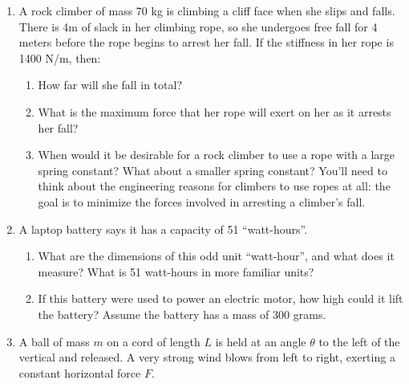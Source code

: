 \documentclass[12pt]{article}
\begin{document}
\Large
\centerline{}
\normalsize
\centerline{}

\begin{enumerate}

\item{A rock climber of mass 70 kg is climbing a cliff face when she slips and falls. There is 4m of slack in her climbing rope, so she undergoes free fall for 4 meters before the rope begins to arrest her fall. If the stiffness in her rope is 1400 N/m, then:}
  \begin{enumerate}
    \item{How far will she fall in total?}
\vspace{2in}

    \item{What is the maximum force that her rope will exert on her as it arrests her fall?}
\vspace{2in}

    \item When would it be desirable for a rock climber to use a rope with a large spring constant? What about a smaller spring constant? You'll need to think about 
          the engineering reasons for climbers to use ropes at all: the goal is to minimize the forces involved in arresting a climber's fall.
   \end{enumerate}

\newpage

 \item{A laptop battery says it has a capacity of 51 ``watt-hours''.}
   \begin{enumerate}
     \item{What are the dimensions of this odd unit ``watt-hour'', and what does it measure? What is 51 watt-hours in more familiar units?}

\vspace{2.5in}

     \item{If this battery were used to power an electric motor, how high could it lift the battery? Assume the battery has a mass of 300 grams.}
\vspace{2.5in}
   \end{enumerate}

\newpage
 \item{A ball of mass $m$ on a cord of length $L$ is held at an angle $\theta$ to the left of the vertical and released. A very strong wind blows from left to right, exerting a constant horizontal force $F$. }


\end{enumerate}
\end{document}
